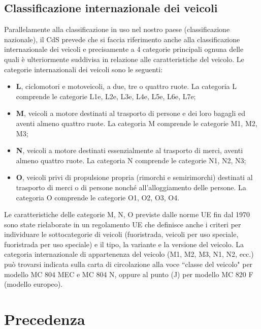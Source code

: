 	      \subsection{Classificazione internazionale dei veicoli}
	      
	      Parallelamente alla classificazione in uso nel nostro paese (classificazione nazionale), il CdS prevede che si faccia riferimento anche alla classificazione internazionale dei veicoli\cite{UE2007} e precisamente a 4 categorie principali ognuna delle quali è ulteriormente suddivisa in relazione alle caratteristiche del veicolo.
	      Le categorie internazionali dei veicoli sono le seguenti:
	      \begin{itemize}
	      	\item \textbf{L}, ciclomotori e motoveicoli, a due, tre o quattro ruote. La categoria L comprende le categorie L1e, L2e, L3e, L4e, L5e, L6e, L7e;
	      	\item \textbf{M}, veicoli a motore destinati al trasporto di persone e dei loro bagagli ed aventi almeno quattro ruote. La categoria M comprende le categorie M1, M2, M3;
	      	\item \textbf{N}, veicoli a motore destinati essenzialmente al trasporto di merci, aventi almeno quattro ruote. La categoria N comprende le categorie N1, N2, N3;
	      	\item \textbf{O}, veicoli privi di propulsione propria (rimorchi e semirimorchi) destinati al trasporto di merci o di persone nonché all'alloggiamento delle persone. La categoria O comprende le categorie O1, O2, O3, O4.
	      \end{itemize}
	      
	      Le caratteristiche delle categorie M, N, O previste dalle norme UE fin dal 1970 sono state rielaborate in un regolamento UE che definisce anche i criteri per individuare le sottocategorie di veicoli (fuoristrada, veicoli per uso speciale, fuoristrada per uso speciale) e il tipo, la variante e la versione del veicolo.
	      La categoria internazionale di appartenenza del veicolo (M1, M2, M3, N1, N2, ecc.) può trovarsi indicata sulla carta di circolazione alla voce ``classe del veicolo" per modello MC 804 MEC e MC 804 N, oppure al punto (J) per modello MC 820 F (modello europeo). 
	      
\section{Precedenza}
\label{sec:prec}


